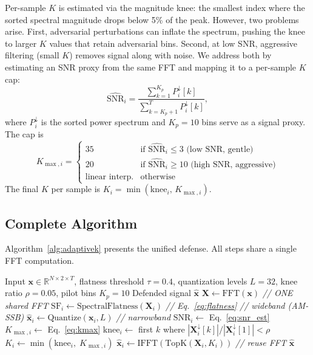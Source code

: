Per-sample $K$ is estimated via the magnitude knee: the smallest index where
the sorted spectral magnitude drops below 5\% of the peak. However, two
problems arise. First, adversarial perturbations can inflate the spectrum,
pushing the knee to larger $K$ values that retain adversarial bins. Second,
at low SNR, aggressive filtering (small $K$) removes signal along with
noise. We address both by estimating an SNR proxy from the same FFT and
mapping it to a per-sample $K$ cap:
\begin{equation}
  \widehat{\text{SNR}}_i = \frac{\sum_{k=1}^{K_p} P_i^{\downarrow}[k]}
    {\sum_{k=K_p+1}^{T} P_i^{\downarrow}[k]},
  \label{eq:snr_est}
\end{equation}
where $P_i^{\downarrow}$ is the sorted power spectrum and $K_p = 10$ bins
serve as a signal proxy. The cap is
\begin{equation}
  K_{\max,i} = \begin{cases}
    35 & \text{if } \widehat{\text{SNR}}_i \leq 3 \text{ (low SNR, gentle)} \\
    20 & \text{if } \widehat{\text{SNR}}_i \geq 10 \text{ (high SNR, aggressive)} \\
    \text{linear interp.} & \text{otherwise}
  \end{cases}
  \label{eq:kmax}
\end{equation}
The final $K$ per sample is $K_i = \min(\text{knee}_i,\, K_{\max,i})$.

\subsection{Complete Algorithm}

Algorithm~\ref{alg:adaptivek} presents the unified defense. All steps share
a single FFT computation.

\begin{algorithm}[!ht]
\caption{Adaptive-$K$: unified spectral defense.}
\label{alg:adaptivek}
\begin{algorithmic}[1]
\Require Input $\mathbf{x} \in \mathbb{R}^{N \times 2 \times T}$,
  flatness threshold $\tau = 0.4$, quantization levels $L = 32$,
  knee ratio $\rho = 0.05$, pilot bins $K_p = 10$
\Ensure Defended signal $\hat{\mathbf{x}}$
\State $\mathbf{X} \leftarrow \text{FFT}(\mathbf{x})$
  \hfill \textit{// ONE shared FFT}
  \State $\text{SF}_i \leftarrow \text{SpectralFlatness}(\mathbf{X}_i)$
    \hfill \textit{// Eq.~\eqref{eq:flatness}}
    \hfill \textit{// wideband (AM-SSB)}
    \State $\hat{\mathbf{x}}_i \leftarrow \text{Quantize}(\mathbf{x}_i, L)$
  \Else
    \hfill \textit{// narrowband}
    \State $\widehat{\text{SNR}}_i \leftarrow$ Eq.~\eqref{eq:snr_est}
    \State $K_{\max,i} \leftarrow$ Eq.~\eqref{eq:kmax}
    \State $\text{knee}_i \leftarrow$ first $k$ where
      $|\mathbf{X}_i^{\downarrow}[k]| / |\mathbf{X}_i^{\downarrow}[1]| < \rho$
    \State $K_i \leftarrow \min(\text{knee}_i,\; K_{\max,i})$
    \State $\hat{\mathbf{x}}_i \leftarrow \text{IFFT}(\mathrm{TopK}(\mathbf{X}_i, K_i))$
      \hfill \textit{// reuse FFT}
  \EndIf
\EndFor
\State \Return $\hat{\mathbf{x}}$
\end{algorithmic}
\end{algorithm}

